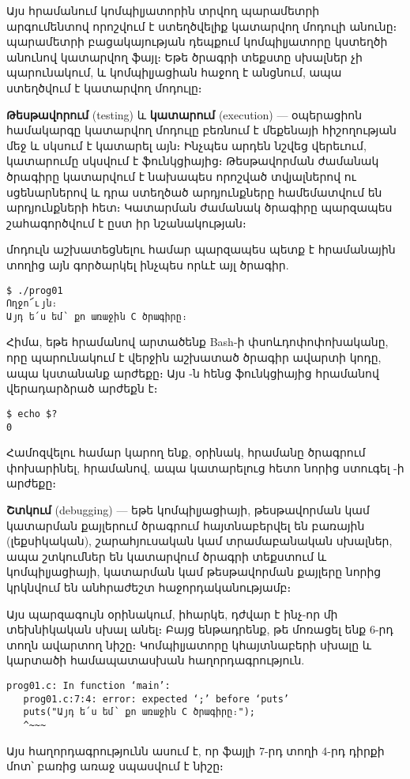 Այս հրամանում կոմպիլյատորին տրվող  պարամետրի արգումենտով
որոշվում է ստեղծվելիք կատարվող մոդուլի անունը։  պարամետրի
բացակայության դեպքում կոմպիլյատորը կստեղծի  անունով
կատարվող ֆայլ։ Եթե ծրագրի տեքստը սխալներ չի պարունակում, և կոմպիլյացիան
հաջող է անցնում, ապա ստեղծվում է  կատարվող մոդուլը։

\textbf{Թեսթավորում} (testing) և \textbf{կատարում} (execution) ---
օպերացիոն համակարգը կատարվող մոդուլը բեռնում է մեքենայի հիշողության
մեջ և սկսում է կատարել այն։ Ինչպես արդեն նշվեց վերեւում, կատարումը
սկսվում է  ֆունկցիայից։ Թեսթավորման ժամանակ ծրագիրը
կատարվում է նախապես որոշված տվյալներով ու սցենարներով և դրա ստեղծած
արդյունքները համեմատվում են արդյունքների հետ։ Կատարման ժամանակ ծրագիրը
պարզապես շահագործվում է ըստ իր նշանակության։

 մոդուլն աշխատեցնելու համար պարզապես պետք է հրամանային
տողից այն գործարկել ինչպես որևէ այլ ծրագիր.

\begin{Verbatim}
$ ./prog01
Ողջո՜ւյն։
Այդ ե՛ս եմ՝ քո առաջին C ծրագիրը։
\end{Verbatim}

Հիմա, եթե  հրամանով արտածենք Bash-ի 
փսոևդոփոփոխականը, որը պարունակում է վերջին աշխատած ծրագիր ավարտի
կոդը, ապա կստանանք  արժեքը։ Այս -ն հենց 
ֆունկցիայից  հրամանով վերադարձրած արժեքն է։

\begin{Verbatim}
$ echo $?
0
\end{Verbatim}

Համոզվելու համար կարող ենք, օրինակ,  հրամանը
ծրագրում փոխարինել,  հրամանով, ապա կատարելուց
հետո նորից ստուգել -ի արժեքը։

\textbf{Շտկում} (debugging) --- եթե կոմպիլյացիայի, թեսթավորման
կամ կատարման քայլերում ծրագրում հայտնաբերվել են բառային (լեքսիկական),
շարահյուսական կամ տրամաբանական սխալներ,  ապա շտկումներ են կատարվում
ծրագրի տեքստում և կոմպիլյացիայի, կատարման կամ թեսթավորման քայլերը
նորից կրկնվում են անհրաժեշտ հաջորդականությամբ։

Այս պարզագույն օրինակում, իհարկե, դժվար է ինչ-որ մի տեխնիկական
սխալ անել։ Բայց ենթադրենք, թե մոռացել ենք 6-րդ տողն ավարտող
\code{;} նիշը։ Կոմպիլյատորը կհայտնաբերի սխալը և կարտածի
համապատասխան հաղորդագրություն.

\begin{Verbatim}
prog01.c: In function ‘main’:
   prog01.c:7:4: error: expected ‘;’ before ‘puts’
   puts("Այդ ե՛ս եմ՝ քո առաջին C ծրագիրը։");
   ^~~~
\end{Verbatim}

Այս հաղորդագրությունն ասում է, որ  ֆայլի 7-րդ տողի 4-րդ
դիրքի մոտ՝  բառից առաջ սպասվում է \code{;} նիշը։
